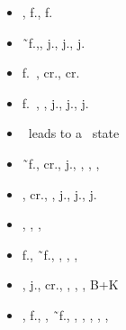\documentclass[a4paper,8pt,onecolumn]{letter}
\begin{document}
\begin{multicols}{2}
\begin{tcolorbox}[width=1.00\linewidth,title=heavies]
\begin{itemize}
\item \hpunch, f.\hpunch, f.\hpunch\cancel \vsone
\item \hpunch\~\ f.\hpunch\cancel\vstwo,\up, j.\mpunch, j.\hpunch, j.\hkick\cancel \qcf\expunch
\item f.\hpunch\ \crush, cr.\mpunch\cancel \qcb\mpunch, cr.\lpunch\cancel\dragonpunch\hkick
\item f.\hpunch\ \crush\cancel \vstwo, \up, j.\mpunch, j.\hpunch, j.\hkick\cancel \qcf\anypunch
\item \vsone \air \qcf\anypunch\ leads to a \crush\ state
\end{itemize}
\end{tcolorbox}
\end{multicols}

\smallbreak
\begin{tcolorbox}[width=1.00\linewidth,title=v-trigger 1]
\begin{itemize}
\item \hpunch\~\ f.\hpunch\cancel \vtone, cr.\hpunch\back\back, j.\hkick, \qcb\hkick, \hkick, \qcb\expunch, \dragonpunch\exkick
\item \hpunch\cancel \vtone, cr.\hpunch\cancel \vstwo, \qcf\lpunch, j.\hpunch\cancel \qcf\lpunch, j.\hpunch\cancel \qcf\lpunch, j.\hpunch\cancel \qcf\expunch
\end{itemize}
\end{tcolorbox}

\smallbreak
\begin{tcolorbox}[width=1.00\linewidth,title=v-trigger 2]
\begin{itemize}
\item \hkick\cancel\vttwo\cancel \anykick, \anypunch, \anykick, \qcb\expunch
\item f.\hpunch\cancel \vttwo, \hpunch\~\ f.\hpunch\cancel \vttwo \anykick, \anypunch, \anykick, \vsone \qcf\expunch, \dragonpunch\exkick
\item \vsone, j.\hkick, cr.\mpunch, \mpunch\cancel \qcb\hkick, \hkick, \qcf\expunch, \vttwo B+K
\item \vsone, f.\hpunch\cancel \vttwo, \down, \hpunch\~\ f.\hpunch\cancel \vttwo, \down, \mpunch\cancel \qcf\mpunch, \mpunch\cancel \vttwo, \anypunch, \anypunch, \anypunch\cancel \qcf\qcf\anypunch
\end{itemize}
\end{tcolorbox}
\end{document}
